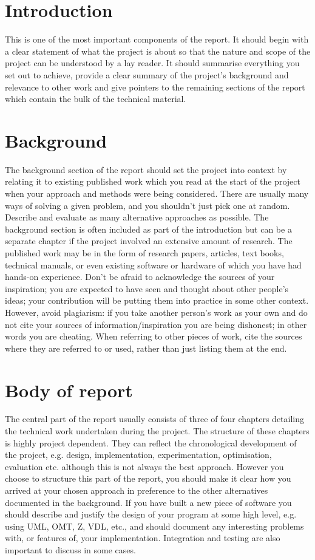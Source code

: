 \documentclass{report}
\begin{document}
\section{Introduction} 
This is one of the most important components of the report. It should begin with a clear statement of what the project is about so that the nature and scope of the project can be understood by a lay reader. It should summarise everything you set out to achieve, provide a clear summary of the project's background and relevance to other work and give pointers to the remaining sections of the report which contain the bulk of the technical material. 

\section{Background} 
The background section of the report should set the project into context by relating it to existing published work which you read at the start of the project when your approach and methods were being considered. There are usually many ways of solving a given problem, and you shouldn't just pick one at random. Describe and evaluate as many alternative approaches as possible. The background section is often included as part of the introduction but can be a separate chapter if the project involved an extensive amount of research. The published work may be in the form of research papers, articles, text books, technical manuals, or even existing software or hardware of which you have had hands-on experience. Don't be afraid to acknowledge the sources of your inspiration; you are expected to have seen and thought about other people's ideas; your contribution will be putting them into practice in some other context. However, avoid plagiarism: if you take another person's work as your own and do not cite your sources of information/inspiration you are being dishonest; in other words you are cheating. When referring to other pieces of work, cite the sources where they are referred to or used, rather than just listing them at the end. 

\section{Body of report} 
The central part of the report usually consists of three of four chapters detailing the technical work undertaken during the project. The structure of these chapters is highly project dependent. They can reflect the chronological development of the project, e.g. design, implementation, experimentation, optimisation, evaluation etc. although this is not always the best approach. However you choose to structure this part of the report, you should make it clear how you arrived at your chosen approach in preference to the other alternatives documented in the background. If you have built a new piece of software you should describe and justify the design of your program at some high level, e.g. using UML, OMT, Z, VDL, etc., and should document any interesting problems with, or features of, your implementation. Integration and testing are also important to discuss in some cases. 
\end{document}
